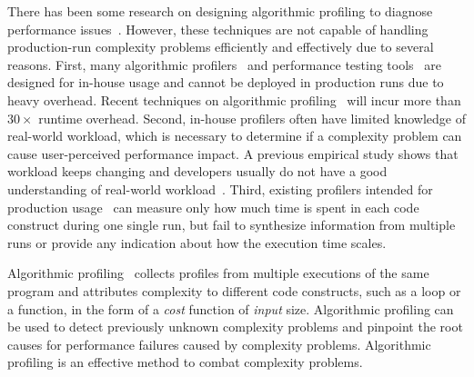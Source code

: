 There has been some research on designing algorithmic profiling 
to diagnose performance issues~\cite{gprof,oprofile}. 
However, these techniques
are not capable of handling production-run complexity problems
efficiently and effectively due to several reasons. 
First, many algorithmic profilers~\cite{?} and performance 
testing tools~\cite{?} are designed for in-house usage and cannot be 
deployed in production runs due to  heavy overhead. 
Recent techniques on algorithmic 
profiling~\cite{Aprof1,Aprof2,AlgoProf} will incur more than $30\times$ runtime overhead.
Second, in-house profilers often have limited knowledge of real-world workload, which is necessary 
to determine if a complexity problem can cause user-perceived performance 
impact. A previous empirical study shows that workload keeps changing and 
developers usually do not have a good understanding of  real-world workload~\citep{PerfBug}.  
Third, existing profilers intended for production usage~\cite{?}
can measure only how much time 
is spent in each code construct during one single run,
but fail to synthesize information from multiple runs
or provide any indication about how the execution time scales.



Algorithmic profiling~\cite{Aprof1,Aprof2,AlgoProf} collects profiles from multiple
executions of the same program and attributes complexity to different code constructs, such as a loop or a function,
in the form of a \textit{cost} function of \textit{input} size.
Algorithmic profiling can be used to detect previously unknown complexity problems and
pinpoint the root causes for performance failures caused by complexity problems.
Algorithmic profiling is an effective method to combat complexity problems. 




